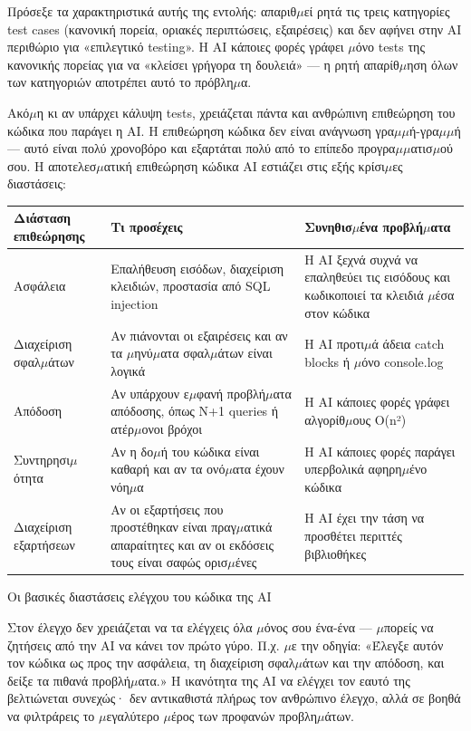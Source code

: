 Πρόσεξε τα χαρακτηριστικά αυτής της εντολής: απαριθ$\mu$εί ρητά τις τρεις κατηγορίες test cases (κανονική πορεία, οριακές περιπτώσεις, εξαιρέσεις) και δεν αφήνει στην AI περιθώριο για «επιλεγτικό testing». Η AI κάποιες φορές γράφει $\mu$όνο tests της κανονικής πορείας για να «κλείσει γρήγορα τη δουλειά» — η ρητή απαρίθ$\mu$ηση όλων των κατηγοριών αποτρέπει αυτό το πρόβλη$\mu$α.


Ακό$\mu$η κι αν υπάρχει κάλυψη tests, χρειάζεται πάντα και ανθρώπινη επιθεώρηση του κώδικα που παράγει η AI. Η επιθεώρηση κώδικα δεν είναι ανάγνωση γρα$\mu$$\mu$ή-γρα$\mu$$\mu$ή — αυτό είναι πολύ χρονοβόρο και εξαρτάται πολύ από το επίπεδο προγρα$\mu$$\mu$ατισ$\mu$ού σου. Η αποτελεσ$\mu$ατική επιθεώρηση κώδικα AI εστιάζει στις εξής κρίσι$\mu$ες διαστάσεις:

\begin{center}
\begin{tabularx}{\linewidth}{|X|X|X|}
\hline
\textbf{Διάσταση επιθεώρησης} & \textbf{Τι προσέχεις} & \textbf{Συνηθισ$\mu$ένα προβλή$\mu$ατα} \tabularnewline
\hline
Ασφάλεια & Επαλήθευση εισόδων, διαχείριση κλειδιών, προστασία από SQL injection & Η AI ξεχνά συχνά να επαληθεύει τις εισόδους και κωδικοποιεί τα κλειδιά $\mu$έσα στον κώδικα \tabularnewline
Διαχείριση σφαλ$\mu$άτων & Αν πιάνονται οι εξαιρέσεις και αν τα $\mu$ηνύ$\mu$ατα σφαλ$\mu$άτων είναι λογικά & Η AI προτι$\mu$ά άδεια catch blocks ή $\mu$όνο console.log \tabularnewline
Απόδοση & Αν υπάρχουν ε$\mu$φανή προβλή$\mu$ατα απόδοσης, όπως N+1 queries ή ατέρ$\mu$ονοι βρόχοι & Η AI κάποιες φορές γράφει αλγορίθ$\mu$ους O(n²) \tabularnewline
Συντηρησι$\mu$ότητα & Αν η δο$\mu$ή του κώδικα είναι καθαρή και αν τα ονό$\mu$ατα έχουν νόη$\mu$α & Η AI κάποιες φορές παράγει υπερβολικά αφηρη$\mu$ένο κώδικα \tabularnewline
Διαχείριση εξαρτήσεων & Αν οι εξαρτήσεις που προστέθηκαν είναι πραγ$\mu$ατικά απαραίτητες και αν οι εκδόσεις τους είναι σαφώς ορισ$\mu$ένες & Η AI έχει την τάση να προσθέτει περιττές βιβλιοθήκες \tabularnewline
\hline
\end{tabularx}
\end{center}

\begin{center}\small\color{gray}Οι βασικές διαστάσεις ελέγχου του κώδικα της AI\end{center}

Στον έλεγχο δεν χρειάζεται να τα ελέγχεις όλα $\mu$όνος σου ένα-ένα — $\mu$πορείς να ζητήσεις από την AI να κάνει τον πρώτο γύρο. Π.χ. $\mu$ε την οδηγία: «Έλεγξε αυτόν τον κώδικα ως προς την ασφάλεια, τη διαχείριση σφαλ$\mu$άτων και την απόδοση, και δείξε τα πιθανά προβλή$\mu$ατα.» Η ικανότητα της AI να ελέγχει τον εαυτό της βελτιώνεται συνεχώς· δεν αντικαθιστά πλήρως τον ανθρώπινο έλεγχο, αλλά σε βοηθά να φιλτράρεις το $\mu$εγαλύτερο $\mu$έρος των προφανών προβλη$\mu$άτων.

